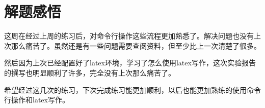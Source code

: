 \chapter{解题感悟}
\label{cp:notes}





这周在经过上周的练习后，对命令行操作这些流程更加熟悉了。解决问题也没有上次那么痛苦了。虽然还是有一些问题需要查阅资料，但至少比上一次清楚了很多。

然后因为上次已经配置好了latex环境，学习了怎么使用latex写作，这次实验报告的撰写也明显顺利了许多，完全没有上次那么痛苦了。

希望经过这几次的练习，下次完成练习能更加顺利，以后也能更加熟练的使用命令行操作和latex写作。